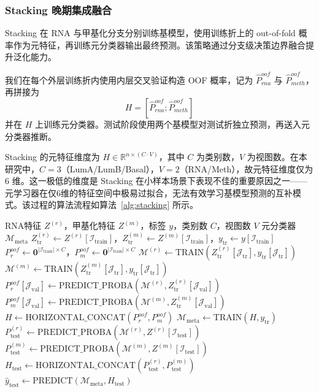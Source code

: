 \subsubsection{Stacking 晚期集成融合}

Stacking 在 RNA 与甲基化分支分别训练基模型，使用训练折上的 out-of-fold 概率作为元特征，再训练元分类器输出最终预测。该策略通过分支级决策边界融合提升泛化能力。

我们在每个外层训练折内使用内层交叉验证构造 OOF 概率，记为 $\hat{P}_{rna}^{oof}$ 与 $\hat{P}_{meth}^{oof}$，再拼接为
\[
H=[\hat{P}_{rna}^{oof};\hat{P}_{meth}^{oof}]
\]
并在 $H$ 上训练元分类器。测试阶段使用两个基模型对测试折独立预测，再送入元分类器推断。

Stacking 的元特征维度为 $H \in \mathbb{R}^{n \times (C \cdot V)}$，其中 $C$ 为类别数，$V$ 为视图数。在本研究中，$C=3$（LumA/LumB/Basal），$V=2$（RNA/Meth），故元特征维度仅为 6 维。这一极低的维度是 Stacking 在小样本场景下表现不佳的重要原因之一——元学习器在仅6维的特征空间中极易过拟合，无法有效学习基模型预测的互补模式。该过程的算法流程如算法~\ref{alg:stacking} 所示。

\begin{algorithm}[H]
\caption{Stacking晚期集成融合算法}
\label{alg:stacking}
\begin{algorithmic}[1]
\Require RNA特征 $Z^{(r)}$，甲基化特征 $Z^{(m)}$，标签 $y$，类别数 $C$，视图数 $V$
\Ensure 元分类器 $\mathcal{M}_{\text{meta}}$
    \State $Z^{(r)}_{\text{tr}} \gets Z^{(r)}[\mathcal{I}_{\text{train}}]$，$Z^{(m)}_{\text{tr}} \gets Z^{(m)}[\mathcal{I}_{\text{train}}]$，$y_{\text{tr}} \gets y[\mathcal{I}_{\text{train}}]$
    \State $P^{oof}_r \gets \mathbf{0}^{|\mathcal{I}_{\text{train}}| \times C}$，$P^{oof}_m \gets \mathbf{0}^{|\mathcal{I}_{\text{train}}| \times C}$
        \State $\mathcal{M}^{(r)} \gets \text{TRAIN}(Z^{(r)}_{\text{tr}}[\mathcal{J}_{\text{tr}}], y_{\text{tr}}[\mathcal{J}_{\text{tr}}])$
        \State $\mathcal{M}^{(m)} \gets \text{TRAIN}(Z^{(m)}_{\text{tr}}[\mathcal{J}_{\text{tr}}], y_{\text{tr}}[\mathcal{J}_{\text{tr}}])$
        \State $P^{oof}_r[\mathcal{J}_{\text{val}}] \gets \text{PREDICT\_PROBA}(\mathcal{M}^{(r)}, Z^{(r)}_{\text{tr}}[\mathcal{J}_{\text{val}}])$
        \State $P^{oof}_m[\mathcal{J}_{\text{val}}] \gets \text{PREDICT\_PROBA}(\mathcal{M}^{(m)}, Z^{(m)}_{\text{tr}}[\mathcal{J}_{\text{val}}])$
    \EndFor
    \State $H \gets \text{HORIZONTAL\_CONCAT}(P^{oof}_r, P^{oof}_m)$
    \State $\mathcal{M}_{\text{meta}} \gets \text{TRAIN}(H, y_{\text{tr}})$
    \State $P^{(r)}_{\text{test}} \gets \text{PREDICT\_PROBA}(\mathcal{M}^{(r)}, Z^{(r)}[\mathcal{I}_{\text{test}}])$
    \State $P^{(m)}_{\text{test}} \gets \text{PREDICT\_PROBA}(\mathcal{M}^{(m)}, Z^{(m)}[\mathcal{I}_{\text{test}}])$
    \State $H_{\text{test}} \gets \text{HORIZONTAL\_CONCAT}(P^{(r)}_{\text{test}}, P^{(m)}_{\text{test}})$
    \State $\hat{y}_{\text{test}} \gets \text{PREDICT}(\mathcal{M}_{\text{meta}}, H_{\text{test}})$
\EndFor
\end{algorithmic}
\end{algorithm}


